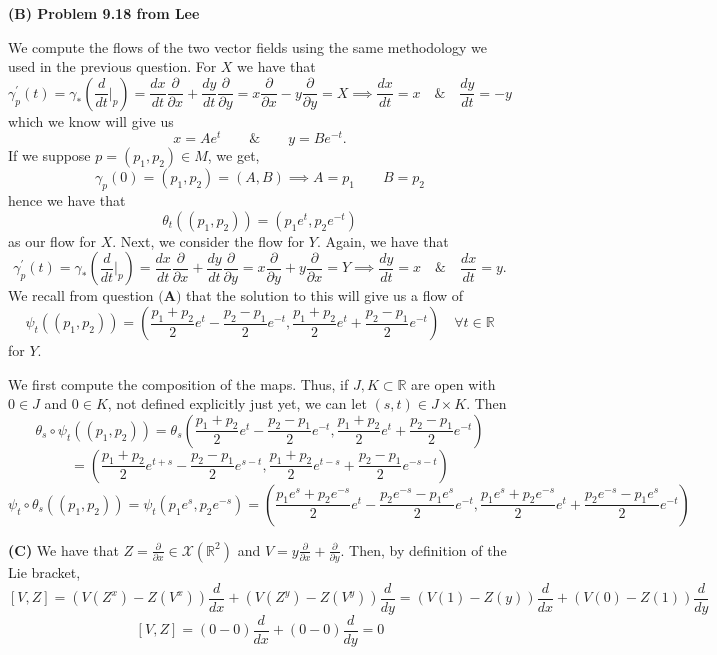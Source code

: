 \documentclass[10pt]{article}
\newcommand{\R}{\mathbb{R}}
\newcommand{\di}[2][]{\frac{\partial #1}{\partial #2}}
\newcommand{\del}[2][]{\frac{d #1}{d #2}}
\begin{document}
\textbf{(B) Problem 9.18 from Lee} 

We compute the flows of the two vector fields using the same methodology we used in the previous question. For $X$ we have that
\[ \gamma^{\prime}_{p}(t) = \gamma_{*}\left(\del{t}\bigg|_{p}\right) = \del[x]{t}\di{x} + \del[y]{t}\di{y} = x\di{x} - y\di{y} = X  \implies \del[x]{t} = x \hspace{1em} \& \hspace{1em} \del[y]{t} = -y\]
which we know will give us
\[ x = Ae^{t} \hspace{2em} \& \hspace{2em} y = Be^{-t}. \]
If we suppose $p = (p_{1},p_{2})\in M$, we get,
\[ \gamma_{p}(0) = (p_{1},p_{2}) = (A,B) \implies A = p_{1} \hspace{2em} B = p_{2}\]
hence we have that
\[ \theta_{t}((p_{1},p_{2})) = (p_{1}e^{t},p_{2}e^{-t}) \]
as our flow for $X$. Next, we consider the flow for $Y$. Again, we have that
\[ \gamma^{\prime}_{p}(t) = \gamma_{*}\left(\del{t}\bigg|_{p}\right) = \del[x]{t}\di{x} + \del[y]{t}\di{y} = x\di{y} + y\di{x} = Y  \implies \del[y]{t} = x \hspace{1em} \& \hspace{1em} \del[x]{t} = y.\]
We recall from question $\textbf{(A)}$ that the solution to this will give us a flow of 
\[ \psi_{t}((p_{1},p_{2})) = \left(\frac{p_{1}+p_{2}}{2}e^{t} - \frac{p_{2} - p_{1}}{2}e^{-t}, \frac{p_{1}+p_{2}}{2}e^{t} + \frac{p_{2} - p_{1}}{2}e^{-t}\right) \hspace{1em} \forall t\in \R\]
for $Y$.

We first compute the composition of the maps. Thus, if $J,K \subset \R$ are open with $0\in J$ and $0\in K$, not defined explicitly just yet,  we can let $(s,t) \in J\times K$. Then
\[ \theta_{s}\circ \psi_{t} ((p_{1},p_{2})) = \theta_{s}\left(\frac{p_{1}+p_{2}}{2}e^{t} - \frac{p_{2} - p_{1}}{2}e^{-t}, \frac{p_{1}+p_{2}}{2}e^{t} + \frac{p_{2} - p_{1}}{2}e^{-t}\right)\]
\[= \left(\frac{p_{1}+p_{2}}{2}e^{t+s} - \frac{p_{2} - p_{1}}{2}e^{s-t}, \frac{p_{1}+p_{2}}{2}e^{t-s} + \frac{p_{2} - p_{1}}{2}e^{-s-t}\right)\]
\[ \psi_{t}\circ\theta_{s} ((p_{1},p_{2})) = \psi_{t}(p_{1}e^{s},p_{2}e^{-s}) = \left(\frac{p_{1}e^{s}+p_{2}e^{-s}}{2}e^{t} - \frac{p_{2}e^{-s} - p_{1}e^{s}}{2}e^{-t}, \frac{p_{1}e^{s}+p_{2}e^{-s}}{2}e^{t} + \frac{p_{2}e^{-s} - p_{1}e^{s}}{2}e^{-t}\right) \]


\textbf{(C)} We have that $Z = \di{x} \in \mathcal{X}(\R^{2})$ and $V = y\di{x} + \di{y}$. Then, by definition of the Lie bracket,
\[ [V,Z] = (V(Z^{x}) - Z(V^{x}))\del{x} + (V(Z^{y}) - Z(V^{y}))\del{y} = (V(1) - Z(y))\del{x} + (V(0) - Z(1))\del{y}\]
\[ [V,Z] = (0 - 0)\del{x} + (0 - 0)\del{y} = 0 \]
\end{document}
